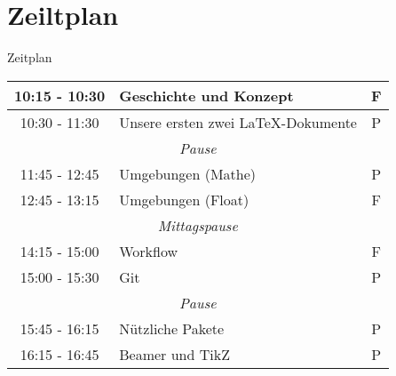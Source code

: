 \documentclass[11pt]{beamer}
\begin{document}
\section{Zeiltplan}
\begin{frame}[fragile]{Zeitplan}
\small{
	\begin{table}
	\centering
	\begin{tabular}{c|l|c}
	\toprule
	10:15 - 10:30 & Geschichte und Konzept & F\\
	\midrule
	10:30 - 11:30 & Unsere ersten zwei \LaTeX -Dokumente & P\\
	\midrule
	\multicolumn{3}{c}{\textit{Pause}}\\
	\midrule
	11:45 - 12:45 & Umgebungen (Mathe) & P\\
	\midrule
	12:45 - 13:15 & Umgebungen (Float) & F\\
	\midrule
	\multicolumn{3}{c}{\textit{Mittagspause}}\\
	\midrule
	14:15 - 15:00 & Workflow & F\\
	\midrule
	15:00 - 15:30 & Git & P\\
	\midrule
	\multicolumn{3}{c}{\textit{Pause}}\\
	\midrule
	15:45 - 16:15 & Nützliche Pakete & P\\
	\midrule
	16:15 - 16:45 & Beamer und TikZ & P\\
	\bottomrule
	\end{tabular}
	\end{table}
}
\end{frame}
\end{document}
